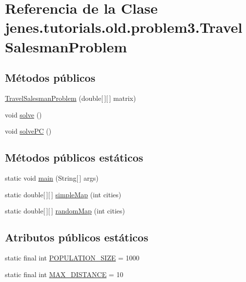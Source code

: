\hypertarget{classjenes_1_1tutorials_1_1old_1_1problem3_1_1_travel_salesman_problem}{\section{Referencia de la Clase jenes.\-tutorials.\-old.\-problem3.\-Travel\-Salesman\-Problem}
\label{classjenes_1_1tutorials_1_1old_1_1problem3_1_1_travel_salesman_problem}
}
\subsection*{Métodos públicos}
\begin{DoxyCompactItemize}
\item 
\hyperlink{classjenes_1_1tutorials_1_1old_1_1problem3_1_1_travel_salesman_problem_ae81620be1ad206e8226f0c0dc913ab44}{Travel\-Salesman\-Problem} (double\mbox{[}$\,$\mbox{]}\mbox{[}$\,$\mbox{]} matrix)
\item 
void \hyperlink{classjenes_1_1tutorials_1_1old_1_1problem3_1_1_travel_salesman_problem_ac5e087aada09768a49ab10f7178e938f}{solve} ()
\item 
void \hyperlink{classjenes_1_1tutorials_1_1old_1_1problem3_1_1_travel_salesman_problem_a94afc262b0ac0e840be70087dd6e11f3}{solve\-P\-C} ()
\end{DoxyCompactItemize}
\subsection*{Métodos públicos estáticos}
\begin{DoxyCompactItemize}
\item 
static void \hyperlink{classjenes_1_1tutorials_1_1old_1_1problem3_1_1_travel_salesman_problem_a4688916bf8ef318b6fae58a75c0e3184}{main} (String\mbox{[}$\,$\mbox{]} args)
\item 
static double\mbox{[}$\,$\mbox{]}\mbox{[}$\,$\mbox{]} \hyperlink{classjenes_1_1tutorials_1_1old_1_1problem3_1_1_travel_salesman_problem_a7fbfddf2063f030d8b44585843eab8c6}{simple\-Map} (int cities)
\item 
static double\mbox{[}$\,$\mbox{]}\mbox{[}$\,$\mbox{]} \hyperlink{classjenes_1_1tutorials_1_1old_1_1problem3_1_1_travel_salesman_problem_a19e333c608bc56c65b32c5fc98dc760a}{random\-Map} (int cities)
\end{DoxyCompactItemize}
\subsection*{Atributos públicos estáticos}
\begin{DoxyCompactItemize}
\item 
static final int \hyperlink{classjenes_1_1tutorials_1_1old_1_1problem3_1_1_travel_salesman_problem_a388d4fcbb82c911c4646c5de782f4d59}{P\-O\-P\-U\-L\-A\-T\-I\-O\-N\-\_\-\-S\-I\-Z\-E} = 1000
\item 
static final int \hyperlink{classjenes_1_1tutorials_1_1old_1_1problem3_1_1_travel_salesman_problem_a5f210d5ce4eb968b6c8e62b2c5d1a93a}{M\-A\-X\-\_\-\-D\-I\-S\-T\-A\-N\-C\-E} = 10
\end{DoxyCompactItemize}


